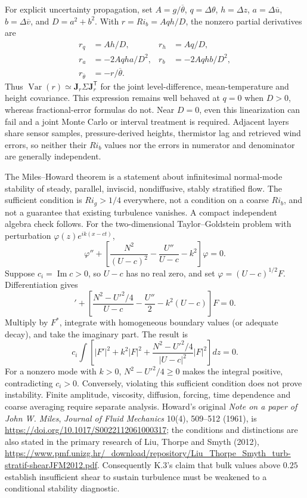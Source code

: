 For explicit uncertainty propagation, set $A=g/\overline\theta$,
$q=\Delta\theta$, $h=\Delta z$, $a=\Delta\overline u$,
$b=\Delta\overline v$, and $D=a^2+b^2$. With $r=Ri_b=Aqh/D$, the
nonzero partial derivatives are
\begin{align}
 r_q&=Ah/D,& r_h&=Aq/D,\\
 r_a&=-2Aqha/D^2,&r_b&=-2Aqhb/D^2,\\
 r_{\overline\theta}&=-r/\overline\theta.
\end{align}
Thus $\operatorname{Var}(r)\simeq\boldsymbol J_r\Sigma
\boldsymbol J_r^{\mathsf T}$ for the joint level-difference, mean-temperature
and height covariance. This expression remains well behaved at $q=0$
when $D>0$, whereas fractional-error formulas do not. Near $D=0$, even
this linearization can fail and a joint Monte Carlo or interval treatment
is required. Adjacent layers share sensor samples, pressure-derived
heights, thermistor lag and retrieved wind errors, so neither their
$Ri_b$ values nor the errors in numerator and denominator are generally
independent.

The Miles--Howard theorem is a statement about infinitesimal normal-mode
stability of steady, parallel, inviscid, nondiffusive, stably stratified
flow. The sufficient condition is $Ri_g>1/4$ everywhere, not a condition
on a coarse $Ri_b$, and not a guarantee that existing turbulence vanishes.
A compact independent algebra check follows. For the two-dimensional
Taylor--Goldstein problem with perturbation $\varphi(z)e^{ik(x-ct)}$,
\begin{equation}
 \varphi''+\left[\frac{N^2}{(U-c)^2}
 -\frac{U''}{U-c}-k^2\right]\varphi=0.
\end{equation}
Suppose $c_i=\operatorname{Im}c>0$, so $U-c$ has no real zero, and set
$\varphi=(U-c)^{1/2}F$. Differentiation gives
\begin{equation}
 [(U-c)F']'+\left[\frac{N^2-U'^2/4}{U-c}
              -\frac{U''}{2}-k^2(U-c)\right]F=0.
\end{equation}
Multiply by $F^*$, integrate with homogeneous boundary values (or
adequate decay), and take the imaginary part. The result is
\begin{equation}
 c_i\int\left[|F'|^2+k^2|F|^2+
       \frac{N^2-U'^2/4}{|U-c|^2}|F|^2\right]dz=0.
\end{equation}
For a nonzero mode with $k>0$, $N^2-U'^2/4\geq0$ makes the integral
positive, contradicting $c_i>0$. Conversely, violating this sufficient
condition does not prove instability. Finite amplitude, viscosity,
diffusion, forcing, time dependence and coarse averaging require separate
analysis. Howard's original \emph{Note on a paper of John W. Miles},
\emph{Journal of Fluid Mechanics} 10(4), 509--512 (1961), is
\url{https://doi.org/10.1017/S0022112061000317}; the conditions and distinctions
are also stated in the primary research of Liu, Thorpe and Smyth (2012),
\url{https://www.pmf.unizg.hr/_download/repository/Liu_Thorpe_Smyth_turb-stratif-shearJFM2012.pdf}.
Consequently K.3's claim that bulk values above $0.25$ establish insufficient
shear to sustain turbulence must be weakened to a conditional stability
diagnostic.

